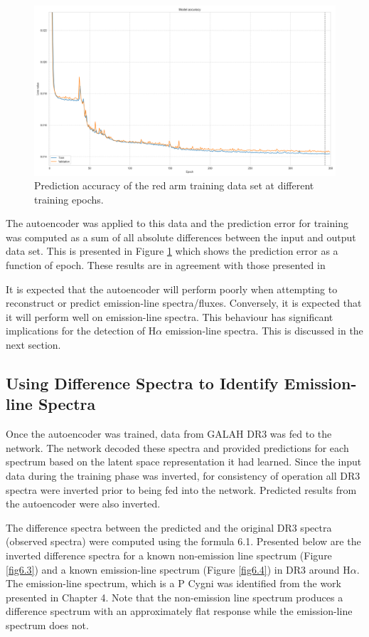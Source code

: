 \begin{figure}[!htb]
\centering
\includegraphics[scale=0.38]{figures/ann_network_loss.png}
\caption{Prediction accuracy of the red arm training data set at different training epochs.}
\label{fig6.2}
\end{figure}
The autoencoder was applied to this data and the prediction error for training was computed as a sum of all absolute differences between the input and output data set. This is presented in Figure \ref{fig6.2} which shows the prediction error as a function of epoch. These results are in agreement with those presented in \citet{vcotar2021galah}

It is expected that the autoencoder will perform poorly when attempting to reconstruct or predict emission-line spectra/fluxes. Conversely, it is expected that it will perform well on emission-line spectra. This behaviour has significant implications for the detection of H$\alpha$ emission-line spectra. This is discussed in the next section.

\subsection{Using Difference Spectra to Identify Emission-line Spectra}

Once the autoencoder was trained, data from GALAH DR3 was fed to the network. The network decoded these spectra and provided predictions for each spectrum based on the latent space representation it had learned. Since the input data during the training phase was inverted, for consistency of operation all DR3 spectra were inverted prior to being fed into the network. Predicted results from the autoencoder were also inverted.

The difference spectra between the predicted and the original DR3 spectra (observed spectra) were computed using the formula 6.1. Presented below are the inverted difference spectra for a known non-emission line spectrum (Figure \ref{fig6.3}) and a known emission-line spectrum (Figure \ref{fig6.4}) in DR3 around H$\alpha$. The emission-line spectrum, which is a P Cygni was identified from the work presented in Chapter 4. Note that the non-emission line spectrum produces a difference spectrum with an approximately flat response while the emission-line spectrum does not. 

